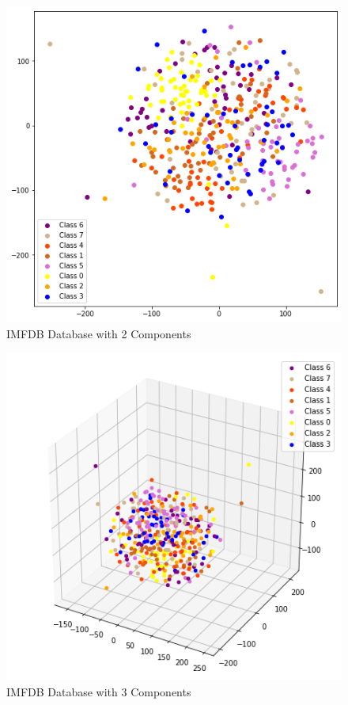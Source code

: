 \documentclass[12pt]{article}
\newenvironment{problem}[2][Problem]{\begin{trivlist}
\item[\hskip \labelsep {\bfseries #1}\hskip \labelsep {\bfseries #2.}]}{\end{trivlist}}
\begin{document}
\begin{problem}{3}
	
		\begin{figure}[H]
		\centering
		\includegraphics[width=16cm]{IMFDB_Database_with_2_Components.png}
		\caption{IMFDB Database with 2 Components}
	\end{figure}
	
	
	\begin{figure}[H]
		\centering
		\includegraphics[width=16cm]{IMFDB_Database_with_3_Components.png}
		\caption{IMFDB Database with 3 Components}
	\end{figure}
	

\end{problem}
\end{document}
